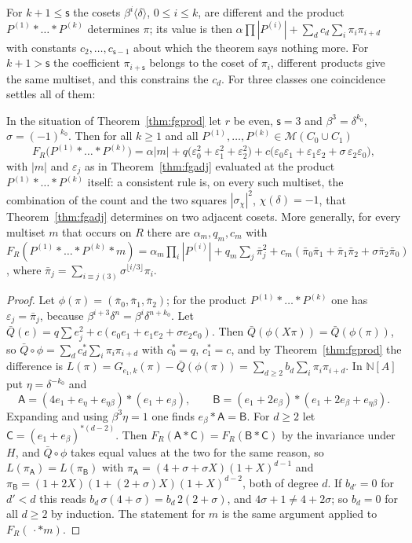 For $k+1\le\mathsf{s}$ the cosets $\beta^{i}\langle\delta\rangle$, $0\le i\le k$, are different and the product $P^{(1)}*\dots*P^{(k)}$ determines $\pi$; its value is then $\alpha\prod|P^{(i)}|+\sum_dc_d\sum_i\pi_i\pi_{i+d}$ with constants $c_2,\dots,c_{\mathsf{s}-1}$ about which the theorem says nothing more. For $k+1>\mathsf{s}$ the coefficient $\pi_{i+\mathsf{s}}$ belongs to the coset of $\pi_i$, different products give the same multiset, and this constrains the $c_d$. For three classes one coincidence settles all of them:

\begin{theorem}\label{thm:fgthree}
In the situation of Theorem~\ref{thm:fgprod} let $r$ be even, $\mathsf{s}=3$ and $\beta^{3}=\delta^{k_0}$, $\sigma=(-1)^{k_0}$. Then for all $k\ge1$ and all $P^{(1)},\dots,P^{(k)}\in\mathcal{M}(C_0\cup C_1)$
\[
F_R\bigl(P^{(1)}*\dots*P^{(k)}\bigr)=\alpha|m|+q\bigl(\varepsilon_0^{2}+\varepsilon_1^{2}+\varepsilon_2^{2}\bigr)+c\bigl(\varepsilon_0\varepsilon_1+\varepsilon_1\varepsilon_2+\sigma\,\varepsilon_2\varepsilon_0\bigr),
\]
with $|m|$ and $\varepsilon_j$ as in Theorem~\ref{thm:fgadj} evaluated at the product $P^{(1)}*\dots*P^{(k)}$ itself: a consistent rule is, on every such multiset, the combination of the count and the two squares $|\sigma_\chi|^{2}$, $\chi(\delta)=-1$, that Theorem~\ref{thm:fgadj} determines on two adjacent cosets. More generally, for every multiset $m$ that occurs on $R$ there are $\alpha_m,q_m,c_m$ with $F_R(P^{(1)}*\dots*P^{(k)}*m)=\alpha_m\prod_i|P^{(i)}|+q_m\sum_j\bar\pi_j^{2}+c_m(\bar\pi_0\bar\pi_1+\bar\pi_1\bar\pi_2+\sigma\bar\pi_2\bar\pi_0)$, where $\bar\pi_j=\sum_{i\equiv j\,(3)}\sigma^{\lfloor i/3\rfloor}\pi_i$.
\end{theorem}
\begin{proof}
Let $\phi(\pi)=(\bar\pi_0,\bar\pi_1,\bar\pi_2)$; for the product $P^{(1)}*\dots*P^{(k)}$ one has $\varepsilon_j=\bar\pi_j$, because $\beta^{i+3}\delta^{n}=\beta^{i}\delta^{n+k_0}$. Let $\bar Q(e)=q\sum e_j^{2}+c(e_0e_1+e_1e_2+\sigma e_2e_0)$. Then $\bar Q(\phi(X\pi))=\bar Q(\phi(\pi))$, so $\bar Q\circ\phi=\sum_dc^{\ast}_d\sum_i\pi_i\pi_{i+d}$ with $c^{\ast}_0=q$, $c^{\ast}_1=c$, and by Theorem~\ref{thm:fgprod} the difference is $L(\pi)=G_{e_1,k}(\pi)-\bar Q(\phi(\pi))=\sum_{d\ge2}b_d\sum_i\pi_i\pi_{i+d}$. In $\mathbb{N}[A]$ put $\eta=\delta^{-k_0}$ and
\[
\mathsf{A}=(4e_1+e_\eta+e_{\eta\beta})*(e_1+e_\beta),\qquad \mathsf{B}=(e_1+2e_\beta)*(e_1+2e_\beta+e_{\eta\beta}).
\]
Expanding and using $\beta^{3}\eta=1$ one finds $e_\beta*\mathsf{A}=\mathsf{B}$. For $d\ge2$ let $\mathsf{C}=(e_1+e_\beta)^{*(d-2)}$. Then $F_R(\mathsf{A}*\mathsf{C})=F_R(\mathsf{B}*\mathsf{C})$ by the invariance under $H$, and $\bar Q\circ\phi$ takes equal values at the two for the same reason, so $L(\pi_{\mathsf{A}})=L(\pi_{\mathsf{B}})$ with $\pi_{\mathsf{A}}=(4+\sigma+\sigma X)(1+X)^{d-1}$ and $\pi_{\mathsf{B}}=(1+2X)(1+(2+\sigma)X)(1+X)^{d-2}$, both of degree $d$. If $b_{d'}=0$ for $d'<d$ this reads $b_d\,\sigma(4+\sigma)=b_d\,2(2+\sigma)$, and $4\sigma+1\ne4+2\sigma$; so $b_d=0$ for all $d\ge2$ by induction. The statement for $m$ is the same argument applied to $F_R(\,\cdot*m)$.
\end{proof}

